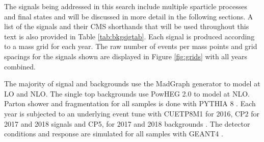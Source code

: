 The signals being addressed in this search include multiple sparticle processes and final states and will be discussed in more detail in the following sections. A list of the signals and their CMS shorthands that will be used throughout this text is also provided in Table \ref{tab:bkgsigtab}. Each signal is produced according to a mass grid for each year.  The raw number of events per mass points and grid spacings for the signals shown are displayed in Figure \ref{fig:grids} with all years combined. 


The majority of signal and backgrounds use the MadGraph \cite{Alwall:2011uj} generator to model at LO and NLO. The single top backgrounds use PowHEG 2.0 \cite{Alioli:2010xd} to model at NLO. Parton shower and fragmentation for all samples is done with PYTHIA 8 \cite{Sjostrand:2014zea}. Each year is subjected to an underlying event tune with CUETP8M1 for 2016, CP2 for 2017 and 2018 signals and CP5, for 2017 and 2018 backgrounds \cite{CMS:2015wcf}\cite{CMS:2019csb}. The detector conditions and response are simulated for all samples with GEANT4 \cite{GEANT4:2002zbu}.

